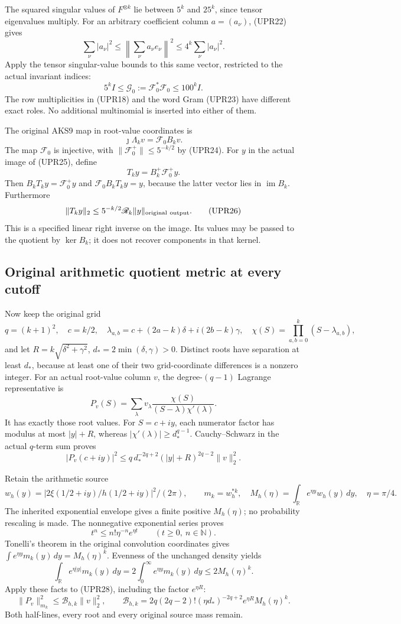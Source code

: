 \documentclass[11pt,a4paper]{article}
\begin{document}
The squared singular values of \(F^{\otimes k}\) lie between
\(5^k\) and \(25^k\), since tensor eigenvalues multiply.
For an arbitrary coefficient column \(a=(a_\nu)\), (UPR22) gives
\[
\sum_\nu|a_\nu|^2
\le\left\|\sum_\nu a_\nu e_\nu\right\|^2
\le4^k\sum_\nu|a_\nu|^2.
\]
Apply the tensor singular-value bounds to this same vector,
restricted to the actual invariant indices:
\[
\boxed{5^kI\le\mathcal G_0:=\mathcal F_0^*\mathcal F_0
\le100^kI.}
\tag{UPR24}
\]
The row multiplicities in (UPR18) and the word Gram (UPR23) have
different exact roles.  No additional multinomial is inserted
into either of them.

The original AKS9 map in root-value coordinates is
\[
\jmath\Lambda_k v=\mathcal F_0B_kv.
\tag{UPR25}
\]
The map \(\mathcal F_0\) is injective, with
\(\|\mathcal F_0^+\|\le5^{-k/2}\) by (UPR24).
For \(y\) in the actual image of (UPR25), define
\[
T_k y=B_k^+\mathcal F_0^+y.
\]
Then \(B_kT_ky=\mathcal F_0^+y\) and
\(\mathcal F_0B_kT_ky=y\), because the latter vector lies in
\(\operatorname{im}B_k\).  Furthermore
\[
\|T_ky\|_2\le5^{-k/2}\mathscr R_k\|y\|_{\rm original\ output}.
\tag{UPR26}
\]
This is a specified linear right inverse on the image.  Its values
may be passed to the quotient by \(\ker B_k\); it does not recover
components in that kernel.

\subsection{Original arithmetic quotient metric at every cutoff}
Now keep the original grid
\[
q=(k+1)^2,\quad c=k/2,\quad
\lambda_{a,b}=c+(2a-k)\delta+i(2b-k)\gamma,\quad
\chi(S)=\prod_{a,b=0}^k(S-\lambda_{a,b}),
\]
and let \(R=k\sqrt{\delta^2+\gamma^2}\),
\(d_*=2\min(\delta,\gamma)>0\).
Distinct roots have separation at least \(d_*\), because at least
one of their two grid-coordinate differences is a nonzero integer.
For an actual root-value column \(v\), the degree-\((q-1)\)
Lagrange representative is
\[
P_v(S)=\sum_\lambda
v_\lambda\frac{\chi(S)}{(S-\lambda)\chi'(\lambda)}.
\tag{UPR27}
\]
It has exactly those root values.  For \(S=c+iy\),
each numerator factor has modulus at most \(|y|+R\), whereas
\(|\chi'(\lambda)|\ge d_*^{q-1}\).
Cauchy--Schwarz in the actual \(q\)-term sum proves
\[
|P_v(c+iy)|^2
\le q\,d_*^{-2q+2}(|y|+R)^{2q-2}\|v\|_2^2.
\tag{UPR28}
\]

Retain the arithmetic source
\[
w_h(y)=|2\xi(1/2+iy)/h(1/2+iy)|^2/(2\pi),\qquad
m_k=w_h^{*k},
\quad
M_h(\eta)=\int_{\mathbb R}e^{\eta y}w_h(y)\,dy,\quad
\eta=\pi/4.
\]
The inherited exponential envelope gives a finite positive
\(M_h(\eta)\); no probability rescaling is made.
The nonnegative exponential series proves
\[
t^n\le n!\eta^{-n}e^{\eta t}\qquad(t\ge0,\ n\in\mathbb N).
\]
Tonelli's theorem in the original convolution coordinates gives
\(\int e^{\eta y}m_k(y)\,dy=M_h(\eta)^k\).
Evenness of the unchanged density yields
\[
\int_{\mathbb R}e^{\eta|y|}m_k(y)\,dy
=2\int_0^\infty e^{\eta y}m_k(y)\,dy
\le2M_h(\eta)^k.
\]
Apply these facts to (UPR28), including the factor \(e^{\eta R}\):
\[
\|P_v\|_{m_k}^2
\le\mathscr B_{h,k}\|v\|_2^2,\qquad
\mathscr B_{h,k}=
2q(2q-2)!(\eta d_*)^{-2q+2}
e^{\eta R}M_h(\eta)^k.
\tag{UPR29}
\]
Both half-lines, every root and every original source mass remain.
\end{document}
